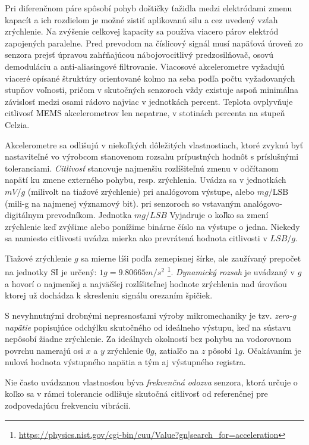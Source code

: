 Pri diferenčnom páre spôsobí pohyb doštičky ťažidla medzi elektródami zmenu kapacít a ich rozdielom je možné zistiť aplikovanú silu a cez uvedený vzťah zrýchlenie. Na zvýšenie celkovej kapacity sa používa viacero párov elektród zapojených paralelne. Pred prevodom na číslicový signál musí napäťová úroveň zo senzora prejsť úpravou zahŕňajúcou nábojovocitlivý predzosilňovač, osovú demoduláciu a anti-aliasingové filtrovanie. Viacosové akcelerometre vyžadujú viaceré opísané štruktúry orientované kolmo na seba podľa počtu vyžadovaných stupňov voľnosti, pričom v skutočných senzoroch vždy existuje aspoň minimálna závislosť medzi osami rádovo najviac v jednotkách percent. Teplota ovplyvňuje citlivosť MEMS akcelerometrov len nepatrne, v stotinách percenta na stupeň Celzia.

Akcelerometre sa odlišujú v niekoľkých dôležitých vlastnostiach, ktoré zvyknú byť nastaviteľné vo výrobcom stanovenom rozsahu prípustných hodnôt s príslušnými toleranciami. \emph{Citlivosť} stanovuje najmenšiu rozlíšiteľnú zmenu v odčítanom napätí ku zmene externého pohybu, resp. zrýchlenia. Uvádza sa v jednotkách $mV/g$ (milivolt na tiažové zrýchlenie) pri analógovom výstupe, alebo $mg/\mathrm{LSB}$ (mili-g na najmenej významový bit). pri senzoroch so vstavaným analógovo-digitálnym prevodníkom. Jednotka $mg/LSB$ Vyjadruje o koľko sa zmení zrýchlenie keď zvýšime alebo ponížime binárne číslo na výstupe o jedna. Niekedy sa namiesto citlivosti uvádza mierka ako prevrátená hodnota citlivosti v $LSB/g$.

Tiažové zrýchlenie $g$ sa mierne líši podľa zemepisnej šírke, ale zaužívaný prepočet na jednotky SI je určený: $1 g = 9.80665 m/s^2$ \footnote{\url{https://physics.nist.gov/cgi-bin/cuu/Value?gn|search_for=acceleration}}. \emph{Dynamický rozsah} je uvádzaný v $g$ a hovorí o najmenšej a najväčšej rozlíšiteľnej hodnote zrýchlenia nad úrovňou ktorej už dochádza k skresleniu signálu orezaním špičiek.

S nevyhnutnými drobnými nepresnosťami výroby mikromechaniky je tzv. \emph{zero-g napätie} popisujúce odchýlku skutočného od ideálneho výstupu, keď na sústavu nepôsobí žiadne zrýchlenie. Za ideálnych okolností bez pohybu na vodorovnom povrchu namerajú osi $x$ a $y$ zrýchlenie $0g$, zatiaľčo na $z$ pôsobí $1g$. Očakávaním je nulová hodnota výstupného napätia a tým aj výstupného registra.

Nie často uvádzanou vlastnosťou býva \emph{frekvenčná odozva} senzora, ktorá určuje o koľko sa v rámci tolerancie odlišuje skutočná citlivosť od referenčnej pre zodpovedajúcu frekvenciu vibrácii.

